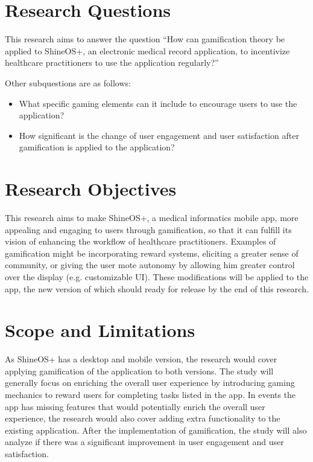 \section{Research Questions}

This research aims to answer the question ``How can gamification theory be applied to ShineOS+, an electronic medical record application, to incentivize healthcare practitioners to use the application regularly?''

Other subquestions are as follows:
\begin{itemize}
\item What specific gaming elements can it include to encourage users to use the application?
\item How significant is the change of user engagement and user satisfaction after gamification is applied to the application?

\end{itemize}

\section{Research Objectives}

This research aims to make ShineOS+, a medical informatics mobile app, more appealing and engaging to users through gamification, so that it can fulfill its vision of enhancing the workflow of healthcare practitioners. Examples of gamification might be incorporating reward systems, eliciting a greater sense of community, or giving the user mote autonomy by allowing him greater control over the display (e.g. customizable UI). These modifications will be applied to the app, the new version of which should ready for release by the end of this research.

\section{Scope and Limitations}

As ShineOS+ has a desktop and mobile version, the research would cover applying gamification of the application to both versions. The study will generally focus on enriching the overall user experience by introducing gaming mechanics to reward users for completing tasks listed in the app. In events the app has missing features that would potentially enrich the overall user experience, the research would also cover adding extra functionality to the existing application.
After the implementation of gamification, the study will also analyze if there was a significant improvement in user engagement and user satisfaction.

